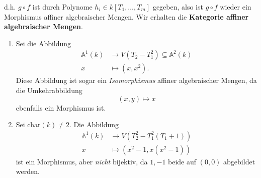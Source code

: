 d.h. $g\circ f$ ist durch Polynome $h_{i}\in k[T_{1},\ldots,T_{m}]$
gegeben, also ist $g\circ f$ wieder ein Morphismus affiner algebraischer
Mengen. Wir erhalten die \textbf{Kategorie affiner algebraischer Mengen}.
\begin{example}
  \label{bsp:morphismen-alg-mengen}
  \mbox{}
  \begin{enumerate}
  \item Sei die Abbildung
    \begin{align*}
      \mathbb{A}^{1}(k) & \rightarrow V(T_{2}-T_{1}^{2})\subseteq\mathbb{A}^{2}(k)\\
      x & \mapsto(x,x^{2}).
    \end{align*}
    Diese Abbildung ist sogar ein \emph{Isomorphismus }affiner algebraischer
    Mengen, da die Umkehrabbildung
    \[
      (x,y)\mapsto x
    \]
    ebenfalls ein Morphismus ist.
  \item Sei char$(k)\neq2$. Die Abbildung
    \begin{align*}
      \mathbb{A}^{1}(k) & \rightarrow V(T_{2}^{2}-T_{1}^{2}(T_{1}+1))\\
      x & \mapsto(x^{2}-1,x(x^{2}-1))
    \end{align*}
    ist ein Morphismus, aber \emph{nicht }bijektiv, da $1,-1$ beide auf
    $(0,0)$ abgebildet werden.
  \end{enumerate}
\end{example}


